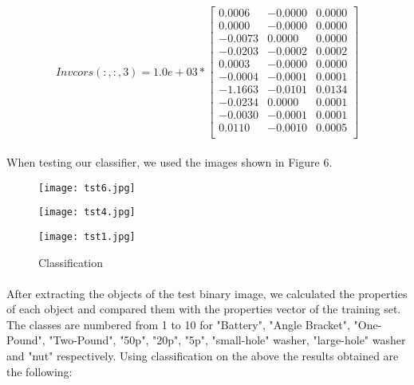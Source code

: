 \documentclass[11pt]{article}
\begin{document}
\[
Invcors(:,:,3) =
   1.0e+03 *
	\begin{bmatrix}
	0.0006&   -0.0000  &  0.0000\\
    0.0000 &  -0.0000  &  0.0000\\
   -0.0073  &  0.0000 &   0.0000\\
   -0.0203  & -0.0002 &   0.0002\\
    0.0003  & -0.0000 &   0.0000\\
   -0.0004  & -0.0001 &   0.0001\\
   -1.1663  & -0.0101 &   0.0134\\
   -0.0234  &  0.0000 &  0.0001\\
   -0.0030  & -0.0001 &   0.0001\\
    0.0110  & -0.0010 &    0.0005\\		
	\end{bmatrix}	   
\]
\newpage
\paragraph{}
When testing our classifier, we used the images shown in Figure 6.

\begin{figure}[H]
	\begin{minipage}{0.32\textwidth}
		\centering
		\texttt{[image: tst6.jpg]}\\
	\end{minipage}%
	\begin{minipage}{0.32\textwidth}
		\centering
		\texttt{[image: tst4.jpg]}\\
	\end{minipage}%
	\begin{minipage}{0.32\textwidth}
		\centering
		\texttt{[image: tst1.jpg]}\\
	\end{minipage}%
	\centering
	\caption{Classification}
\end{figure} 

\paragraph{}
After extracting the objects of the test binary image, we calculated the properties of each object and compared them with the properties vector of the training set. The classes are numbered from 1 to 10 for "Battery", "Angle Bracket", "One-Pound", "Two-Pound", "50p", "20p", "5p", "small-hole" washer, "large-hole" washer and "nut" respectively. Using classification on the above the results obtained  are the following:
\end{document}
